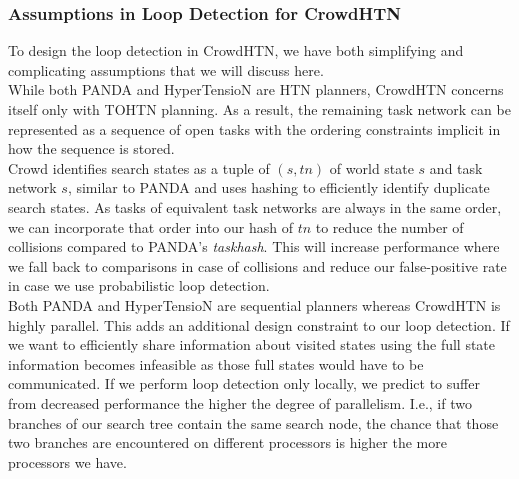 \subsubsection{Assumptions in Loop Detection for CrowdHTN}
\label{ld - tohtn simplifications}
To design the loop detection in CrowdHTN, we have both simplifying and complicating assumptions that we will discuss here. \\
While both PANDA and HyperTensioN are HTN planners, CrowdHTN concerns itself only with TOHTN planning. As a result, the remaining task network can be represented as a sequence of open tasks with the ordering constraints implicit in how the sequence is stored.
 \\
Crowd identifies search states as a tuple of $(s, tn)$ of world state $s$ and task network $s$, similar to PANDA and uses hashing to efficiently identify duplicate search states. As tasks of equivalent task networks are always in the same order, we can incorporate that order into our hash of $tn$ to reduce the number of collisions compared to PANDA's \textit{taskhash}. This will increase performance where we fall back to comparisons in case of collisions and reduce our false-positive rate in case we use probabilistic loop detection. 
 \\
Both PANDA and HyperTensioN are sequential planners whereas CrowdHTN is highly parallel. This adds an additional design constraint to our loop detection. If we want to efficiently share information about visited states using the full state information becomes infeasible as those full states would have to be communicated. If we perform loop detection only locally, we predict to suffer from decreased performance the higher the degree of parallelism. I.e., if two branches of our search tree contain the same search node, the chance that those two branches are encountered on different processors is higher the more processors we have.
\begin{comment}
	- keep the part where we store loop detection information externally
	- be sure we can always assume total order (and keep the ordering information to reduce false-positive rate!)
	- keep completeness of the planner
	- improve on the performance for hashing!
	- 
\end{comment}


